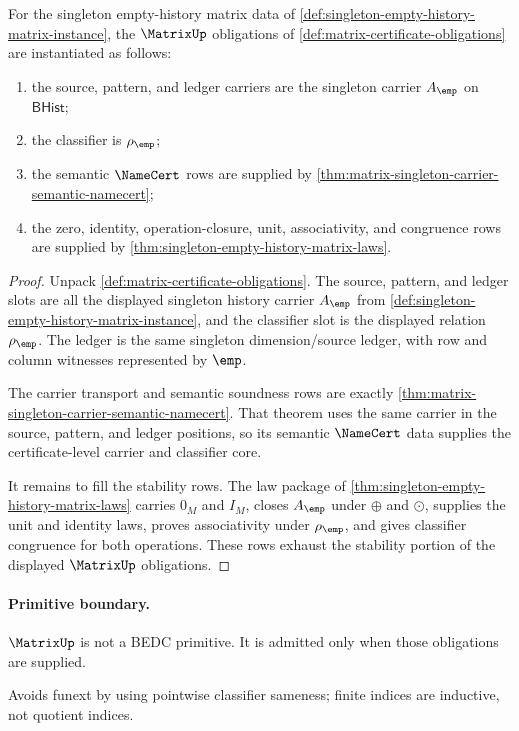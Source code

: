 \begin{theorem}
\label{thm:matrix-singleton-empty-history-certificate-obligations}
For the singleton empty-history matrix data of
\autoref{def:singleton-empty-history-matrix-instance}, the $\MatrixUp$
obligations of \autoref{def:matrix-certificate-obligations} are instantiated
as follows:
\begin{enumerate}
  \item the source, pattern, and ledger carriers are the singleton carrier
  $A_{\emp}$ on $\mathsf{BHist}$;
  \item the classifier is $\rho_{\emp}$;
  \item the semantic $\NameCert$ rows are supplied by
  \autoref{thm:matrix-singleton-carrier-semantic-namecert};
  \item the zero, identity, operation-closure, unit, associativity, and
  congruence rows are supplied by
  \autoref{thm:singleton-empty-history-matrix-laws}.
\end{enumerate}
\end{theorem}
\begin{proof}
Unpack \autoref{def:matrix-certificate-obligations}. The source, pattern, and
ledger slots are all the displayed singleton history carrier $A_{\emp}$ from
\autoref{def:singleton-empty-history-matrix-instance}, and the classifier slot
is the displayed relation $\rho_{\emp}$. The ledger is the same singleton
dimension/source ledger, with row and column witnesses represented by $\emp$.

The carrier transport and semantic soundness rows are exactly
\autoref{thm:matrix-singleton-carrier-semantic-namecert}. That theorem uses
the same carrier in the source, pattern, and ledger positions, so its semantic
$\NameCert$ data supplies the certificate-level carrier and classifier core.

It remains to fill the stability rows. The law package of
\autoref{thm:singleton-empty-history-matrix-laws} carries $0_M$ and $I_M$,
closes $A_{\emp}$ under $\oplus$ and $\odot$, supplies the unit and identity
laws, proves associativity under $\rho_{\emp}$, and gives classifier
congruence for both operations. These rows exhaust the stability portion of
the displayed $\MatrixUp$ obligations.
\end{proof}

\paragraph{Primitive boundary.}
\(\MatrixUp\) is not a BEDC primitive. It is admitted only when those obligations are supplied.

\begin{remark}
\label{rem:matrix-zero-axiom-note}
Avoids funext by using pointwise classifier sameness; finite indices are inductive, not quotient indices.
\end{remark}
